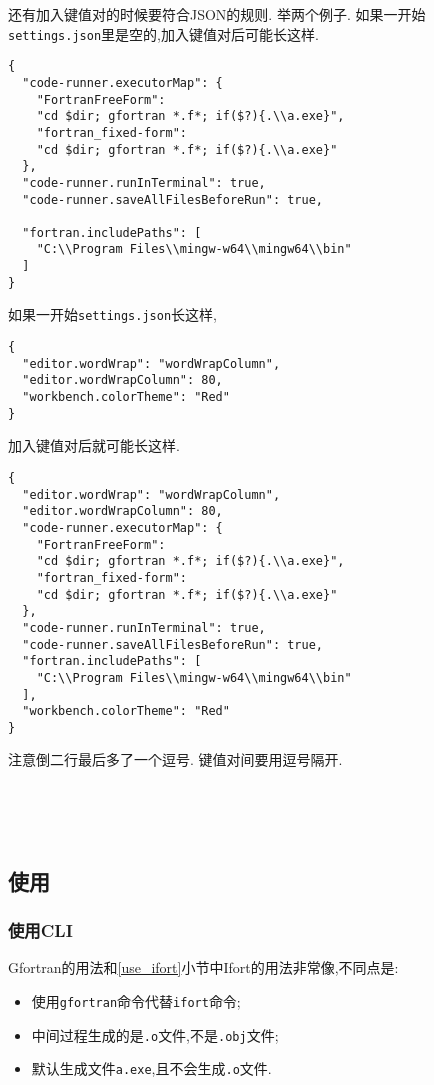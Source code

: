 还有加入键值对的时候要符合JSON的规则. 举两个例子.
如果一开始\verb|settings.json|里是空的,加入键值对后可能长这样.
\begin{verbatim}
{
  "code-runner.executorMap": {
    "FortranFreeForm":
    "cd $dir; gfortran *.f*; if($?){.\\a.exe}",
    "fortran_fixed-form":
    "cd $dir; gfortran *.f*; if($?){.\\a.exe}"
  },
  "code-runner.runInTerminal": true,
  "code-runner.saveAllFilesBeforeRun": true,

  "fortran.includePaths": [
    "C:\\Program Files\\mingw-w64\\mingw64\\bin"
  ]
}
\end{verbatim}
如果一开始\verb|settings.json|长这样,
\begin{verbatim}
{
  "editor.wordWrap": "wordWrapColumn",
  "editor.wordWrapColumn": 80,
  "workbench.colorTheme": "Red"
}
\end{verbatim}
加入键值对后就可能长这样.
\begin{verbatim}
{
  "editor.wordWrap": "wordWrapColumn",
  "editor.wordWrapColumn": 80,
  "code-runner.executorMap": {
    "FortranFreeForm":
    "cd $dir; gfortran *.f*; if($?){.\\a.exe}",
    "fortran_fixed-form":
    "cd $dir; gfortran *.f*; if($?){.\\a.exe}"
  },
  "code-runner.runInTerminal": true,
  "code-runner.saveAllFilesBeforeRun": true,
  "fortran.includePaths": [
    "C:\\Program Files\\mingw-w64\\mingw64\\bin"
  ],
  "workbench.colorTheme": "Red"
}
\end{verbatim}
注意倒二行最后多了一个逗号. 键值对间要用逗号隔开.

~

~

\subsection{使用}\label{use_gfortran}

\subsubsection{使用CLI}
Gfortran的用法和\ref{use_ifort}小节中Ifort的用法非常像,不同点是:
\begin{itemize}
  \item 使用\verb|gfortran|命令代替\verb|ifort|命令;
  \item 中间过程生成的是\verb|.o|文件,不是\verb|.obj|文件;
  \item 默认生成文件\verb|a.exe|,且不会生成\verb|.o|文件.
\end{itemize}

